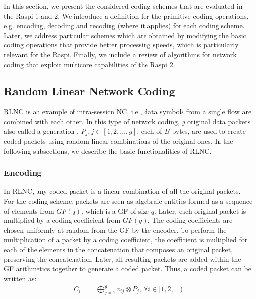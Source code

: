 \label{sec:schemes}

In this section, we present the considered coding schemes that are evaluated
in the \ac{Raspi} 1 and 2.
We introduce a
definition for the primitive coding operations, e.g. encoding,
decoding and recoding (where it applies) for each coding
scheme. Later, we address particular schemes which are obtained by
modifying the basic coding operations that provide better processing
speeds, which is particularly relevant for the \ac{Raspi}.  Finally,
we include a review of algorithms for network coding that exploit
multicore capabilities of the \ac{Raspi} 2.


\subsection{Random Linear Network Coding}
\label{ssec:RLNC}

\ac{RLNC} is an example of intra-session \ac{NC}, i.e., data symbols
from a single flow are combined with each other. In this type of
network coding, $g$ original data packets also called a generation
\cite{chou2003practical}, $P_j, j \in [1,2,\ldots,g]$, each
of $B$ bytes, are used to create coded packets using random linear
combinations of the original ones. In the following subsections, we
describe the basic functionalities of \ac{RLNC}.

\subsubsection{Encoding}
In \ac{RLNC}, any coded packet is a linear combination of all
the original packets. For the coding scheme, packets are seen as
algebraic entities formed as a sequence of elements from $GF(q)$,
which is a \ac{GF} of size $q$. Later, each original packet is
multiplied by a coding coefficient from $GF(q)$. The coding coefficients
are chosen uniformly at random from the \ac{GF} by the encoder. To
perform the multiplication of a packet by a coding coefficient, the
coefficient is multiplied for each of the elements in the
concatenation that composes an original packet, preserving the
concatenation. Later, all resulting packets are added within the
\ac{GF} arithmetics together to generate a coded packet. Thus, a
coded packet can be written as:
%
\begin{align} \label{eq:coded_packet}
C_i  &= \bigoplus_{j=1}^{g} v_{ij} \otimes P_j ,\ \forall i \in [1,2,\ldots)
\end{align}

